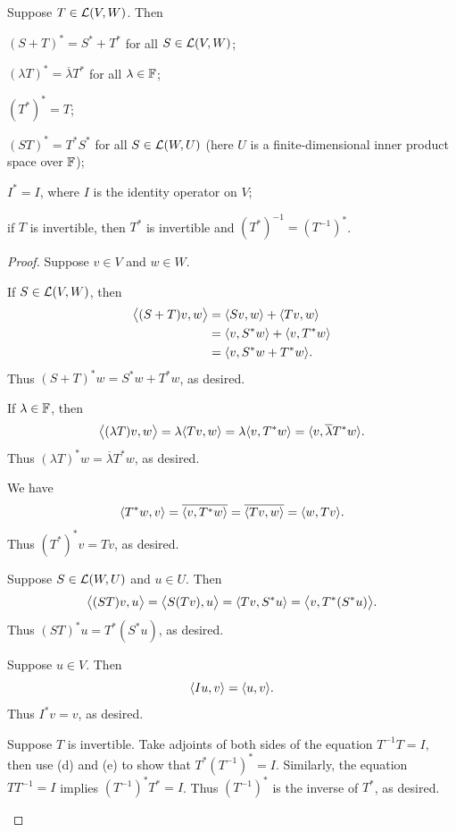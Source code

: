 \begin{result}\label{ax:7.5}
Suppose $T\in\mathcal{L}(V,W)$. Then
\begin{parts}
\item $(S+T)^*=S^*+T^*$ for all $S\in\mathcal{L}(V,W)$;
\item $(\lambda T)^*=\overline{\lambda}T^*$ for all $\lambda\in\mathbb{F}$;
\item $(T^*)^*=T$;
\item $(ST)^*=T^*S^*$ for all $S\in\mathcal{L}(W,U)$ (here $U$ is a finite-dimensional
  inner product space over $\mathbb{F}$);
\item $I^*=I$, where $I$ is the identity operator on $V$;
\item if $T$ is invertible, then $T^*$ is invertible and
  $(T^*)^{-1}=(T^{-1})^*$.
\end{parts}
\end{result}

\begin{proof}
Suppose $v\in V$ and $w\in W$.
\begin{parts}
\item If $S\in\mathcal{L}(V,W)$, then
  \begin{align*}
  \bigl\langle (S+T)v,w\bigr\rangle &= \langle Sv, w \rangle+\langle Tv, w \rangle\\
    &= \langle v, S^*w \rangle+\langle v, T^*w \rangle\\
    &= \langle v, S^*w+T^*w \rangle.
  \end{align*}
  Thus $(S+T)^*w=S^*w+T^*w$, as desired.
\item If $\lambda\in\mathbb{F}$, then
  \[ \bigl\langle (\lambda T)v,w\bigr\rangle = \lambda\langle Tv, w \rangle
     = \lambda\langle v, T^*w \rangle = \langle v, \overline{\lambda}T^*w \rangle. \]
  Thus $(\lambda T)^*w=\overline{\lambda}T^*w$, as desired.
\item We have
  \[ \langle T^*w, v \rangle = \overline{\langle v, T^*w \rangle} = \overline{\langle Tv, w \rangle}
     = \langle w, Tv \rangle. \]
  Thus $(T^*)^*v=Tv$, as desired.
\item Suppose $S\in\mathcal{L}(W,U)$ and $u\in U$. Then
  \[ \bigl\langle (ST)v,u\bigr\rangle = \bigl\langle S(Tv),u\bigr\rangle
     = \langle Tv, S^*u \rangle = \bigl\langle v,T^*(S^*u)\bigr\rangle. \]
  Thus $(ST)^*u=T^*(S^*u)$, as desired.
\item Suppose $u\in V$. Then
  \[ \langle Iu, v \rangle = \langle u, v \rangle. \]
  Thus $I^*v=v$, as desired.
\item Suppose $T$ is invertible. Take adjoints of both sides of the equation
  $T^{-1}T=I$, then use (d) and (e) to show that $T^*(T^{-1})^*=I$. Similarly,
  the equation $TT^{-1}=I$ implies $(T^{-1})^*T^*=I$. Thus $(T^{-1})^*$ is the
  inverse of $T^*$, as desired. \qedhere
\end{parts}
\end{proof}

